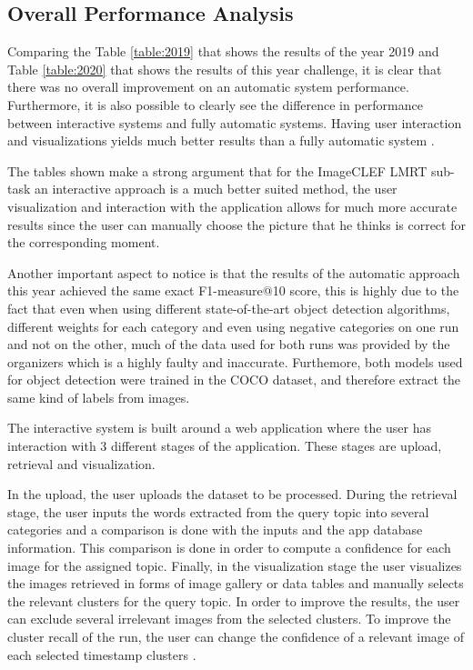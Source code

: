 \subsection{Overall Performance Analysis}
\label{sec:overall_perfomance}

Comparing the Table \ref{table:2019} that shows the results of the year 2019 and Table \ref{table:2020} that shows the results of this year challenge, it is clear that there was no overall improvement on an automatic system performance. Furthermore, it is also possible to clearly see the difference in performance between interactive systems and fully automatic systems. Having user interaction and visualizations yields much better results than a fully automatic system \cite{Ribeiro2020}.


The tables shown make a strong argument that for the ImageCLEF LMRT sub-task an interactive approach is a much better suited method, the user visualization and interaction with the application allows for much more accurate results since the user can manually choose the picture that he thinks is correct for the corresponding moment.

Another important aspect to notice is that the results of the automatic approach this year achieved the same exact F1-measure@10 score, this is highly due to the fact that even when using different state-of-the-art object detection algorithms, different weights for each category and even using negative categories on one run and not on the other, much of the data used for both runs was provided by the organizers which is a highly faulty and inaccurate. Furthemore, both models used for object detection were trained in the COCO dataset, and therefore extract the same kind of labels from images.



The interactive system is built around a web application where the user has interaction with 3 different stages of the application. These stages are upload, retrieval and visualization. 

In the upload, the user uploads the dataset to be processed. During the retrieval stage, the user inputs the words extracted from the query topic into several categories and a comparison is done with the inputs and the app database information. This comparison is done in order to compute a confidence for each image for the assigned topic. Finally, in the visualization stage the user visualizes the images retrieved in forms of image gallery or data tables and manually selects the relevant clusters for the query topic. In order to improve the results, the user can exclude several irrelevant images from the selected clusters. To improve the cluster recall of the run, the user can change the confidence of a relevant image of each selected timestamp clusters \cite{Ribeiro2020}.

